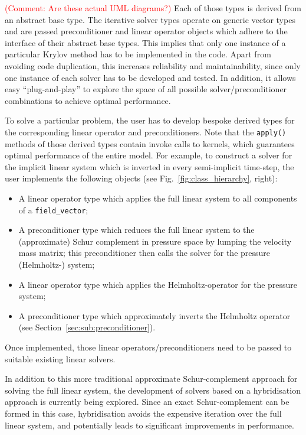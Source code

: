 \documentclass[times]{elsarticle}
\begin{document}
\textcolor{red}{(Comment: Are these actual UML diagrams?)}
Each of those types is derived from an abstract base type. The
iterative solver types operate on generic vector types and are passed
preconditioner and linear operator objects which adhere to the
interface of their abstract base types.  This implies that only one
instance of a particular Krylov method has to be implemented in the
code. Apart from avoiding code duplication, this increases reliability
and maintainability, since only one instance of each solver has to be
developed and tested. In addition, it allows easy ``plug-and-play'' to
explore the space of all possible solver/preconditioner combinations
to achieve optimal performance.

To solve a particular problem, the user has to develop bespoke derived
types for the corresponding linear operator and preconditioners. Note
that the \texttt{apply()} methods of those derived types contain
invoke calls to kernels, which guarantees optimal performance of the entire
model. For example, to construct a solver for the implicit linear
system which is inverted in every semi-implicit time-step, the user
implements the following objects (see Fig.~\ref{fig:class_hierarchy},
right):
\begin{itemize}
\item A linear operator type which applies the full linear system to
  all components of a \texttt{field\_vector};
\item A preconditioner type which reduces the full linear system to
  the (approximate) Schur complement in pressure space by lumping the
  velocity mass matrix; this preconditioner then calls the solver for
  the pressure (Helmholtz-) system;
\item A linear operator type which applies the Helmholtz-operator for
  the pressure system;
\item A preconditioner type which approximately inverts the Helmholtz
  operator (see Section~\ref{sec:sub:preconditioner}).
\end{itemize}
Once implemented, those linear operators/preconditioners need to be
passed to suitable existing linear solvers.

In addition to this more traditional approximate Schur-complement
approach for solving the full linear system, the development of
solvers based on a hybridisation approach is currently being explored. Since
an exact Schur-complement can be formed in this case, hybridisation
avoids the expensive iteration over the full linear system, and
potentially leads to significant improvements in performance.
\end{document}
